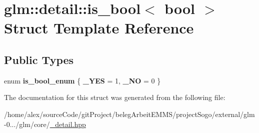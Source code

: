 \hypertarget{structglm_1_1detail_1_1is__bool_3_01bool_01_4}{\section{glm\-:\-:detail\-:\-:is\-\_\-bool$<$ bool $>$ Struct Template Reference}
\label{structglm_1_1detail_1_1is__bool_3_01bool_01_4}
}
\subsection*{Public Types}
\begin{DoxyCompactItemize}
\item 
enum {\bfseries is\-\_\-bool\-\_\-enum} \{ {\bfseries \-\_\-\-Y\-E\-S} = 1, 
{\bfseries \-\_\-\-N\-O} = 0
 \}
\end{DoxyCompactItemize}


The documentation for this struct was generated from the following file\-:\begin{DoxyCompactItemize}
\item 
/home/alex/source\-Code/git\-Project/beleg\-Arbeit\-E\-M\-M\-S/project\-Sogo/external/glm-\/0.../glm/core/\hyperlink{__detail_8hpp}{\-\_\-detail.\-hpp}\end{DoxyCompactItemize}
